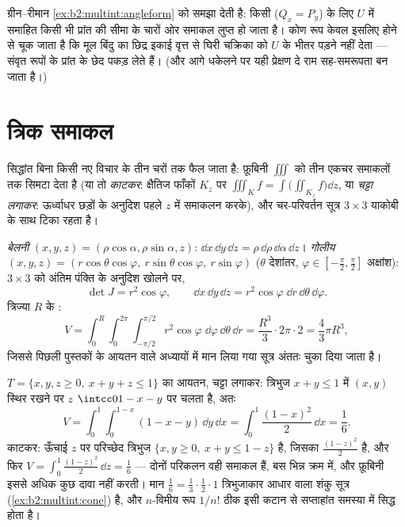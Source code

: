 \begin{remark}
ग्रीन--रीमान \cref{ex:b2:multint:angleform} को समझा देती है: किसी  ($Q_x = P_y$) के लिए
$U$ में समाहित किसी भी प्रांत की सीमा के चारों ओर समाकल लुप्त हो
जाता है। कोण रूप केवल इसलिए  होने से चूक जाता है कि मूल बिंदु
का छिद्र इकाई वृत्त से घिरी चक्रिका को $U$ के भीतर पड़ने नहीं देता
--- संवृत रूपों के  प्रांत के छेद पकड़ लेते हैं। (और आगे
धकेलने पर यही प्रेक्षण दे राम सह-समरूपता बन जाता है।)
\end{remark}

\section{त्रिक समाकल}

सिद्धांत बिना किसी नए विचार के तीन चरों तक फैल जाता है: फ़ूबिनी $\iiint$
को तीन एकचर समाकलों तक सिमटा देता है (या तो \emph{काटकर}: क्षैतिज
फाँकों $K_z$ पर $\iiint_K f = \int\bigl(\iint_{K_z}
f\bigr)\dd z$, या \emph{चट्टा लगाकर}: ऊर्ध्वाधर छड़ों के
अनुदिश पहले $z$ में समाकलन करके), और चर-परिवर्तन सूत्र $3 \times 3$ याकोबी
के साथ टिका रहता है।

\begin{example}[बेलनी और गोलीय निर्देशांक]\label{ex:b2:multint:spherical}
\emph{बेलनी} $(x, y, z) = (\rho\cos\alpha, \rho\sin\alpha,
z)$: $\dd x\,\dd y\,\dd z = \rho\,\dd\rho\,\dd\alpha\,\dd z$। \emph{गोलीय} $(x, y, z) = (r\cos\theta\cos\varphi,\
r\sin\theta\cos\varphi,\ r\sin\varphi)$ ($\theta$ देशांतर, $\varphi \in [-\frac\pi2, \frac\pi2]$
अक्षांश): $3
\times 3$  को अंतिम पंक्ति के अनुदिश खोलने पर,
\[
\det J = r^2\cos\varphi ,
\qquad
\dd x\,\dd y\,\dd z
= r^2\cos\varphi\;\dd r\,\dd\theta\,\dd\varphi .
\]
त्रिज्या $R$ के :
\[
V = \int_0^R\!\!\int_0^{2\pi}\!\!\int_{-\pi/2}^{\pi/2}
r^2\cos\varphi\;\dd\varphi\,\dd\theta\,\dd r
= \frac{R^3}{3}\cdot 2\pi \cdot 2
= \boxed{\frac43\pi R^3} ,
\]
जिससे पिछली पुस्तकों के आयतन वाले अध्यायों में मान लिया गया सूत्र
अंततः चुका दिया जाता है।
\end{example}

\begin{example}[चतुष्फलक, दो बार]
\label{ex:b2:multint:tetra}
$T = \{x, y, z \geq 0,\ x + y + z \leq 1\}$ का आयतन, चट्टा लगाकर: त्रिभुज $x + y \leq 1$ में $(x, y)$ स्थिर रखने पर $z$
$\intcc0{1 - x - y}$ पर चलता है, अतः
\[
V = \int_0^1\!\!\int_0^{1-x}(1 - x - y)\,\dd y\,\dd x
= \int_0^1\frac{(1 - x)^2}{2}\,\dd x = \frac16 .
\]
काटकर: ऊँचाई $z$ पर परिच्छेद त्रिभुज $\{x, y
\geq 0,\ x + y \leq 1 - z\}$ है, जिसका  $\frac{(1-z)^2}2$
है, और फिर $V = \int_0^1\frac{(1-z)^2}2\,\dd z = \frac16$ --- दोनों परिकलन वही समाकल हैं, बस भिन्न क्रम में,
और फ़ूबिनी इससे अधिक कुछ दावा नहीं करती। मान $\frac16 =
\frac13\cdot\frac12\cdot1$ त्रिभुजाकार आधार
वाला शंकु सूत्र (\cref{ex:b2:multint:cone}) है, और $n$-विमीय रूप $1/n!$ ठीक इसी कटान से
सप्ताहांत समस्या में सिद्ध होता है।
\end{example}

